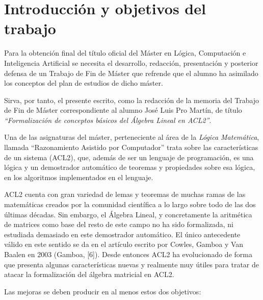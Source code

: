 \documentclass[a4paper,10pt]{article}
\begin{document}
\section{Introducción y objetivos del trabajo}

Para la obtención final del título oficial del Máster en Lógica, Computación e Inteligencia Artificial se necesita el desarrollo, redacción, presentación y posterior defensa de un Trabajo de Fin de Máster que refrende que el alumno ha asimilado los conceptos del plan de estudios de dicho máster.

\par\vspace{10pt}

Sirva, por tanto, el presente escrito, como la redacción de la memoria del Trabajo de Fin de Máster correspondiente al alumno José Luis Pro Martín, de título \emph{``Formalización de conceptos básicos del Álgebra Lineal en ACL2''}.

\par\vspace{10pt}

Una de las asignaturas del máster, perteneciente al área de la \emph{Lógica Matemática}, llamada ``Razonamiento Asistido por Computador'' trata sobre las características de un sistema (ACL2), que, además de ser un lenguaje de programación, es una lógica y un demostrador automático de teoremas y propiedades sobre esa lógica, en los algoritmos implementados en el lenguaje. 

\par\vspace{10pt}

ACL2 cuenta con gran variedad de lemas y teoremas de muchas ramas de las matemáticas creados por la comunidad científica a lo largo sobre todo de las dos últimas décadas. Sin embargo, el Álgebra Lineal, y concretamente la aritmética de matrices como base del resto de este campo no ha sido formalizada, ni estudiada demasiado en este demostrador automático. El único antecedente válido en este sentido se da en el artículo escrito por Cowles, Gamboa y Van Baalen en 2003 (Gamboa, [6]). Desde entonces ACL2 ha evolucionado de forma que presenta algunas características nuevas y realmente muy útiles para tratar de atacar la formalización del álgebra matricial en ACL2.

\par\vspace{10pt}

Las mejoras se deben producir en al menos estos dos objetivos:
\end{document}
